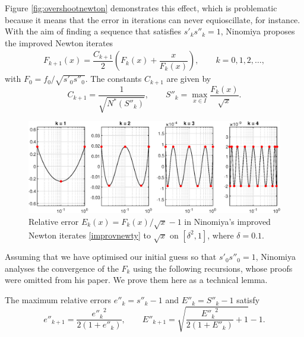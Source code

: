 Figure \ref{fig:overshootnewton} demonstrates this effect, which is problematic because it means that the error in iterations can never equioscillate, for instance. With the aim of finding a sequence that satisfies $s'_ks''_k=1$, Ninomiya proposes the improved Newton iterates
\begin{align}
   F_{k+1}(x) = \dfrac{C_{k+1}}{2}\left(F_k(x)+\dfrac{x}{F_k(x)}\right), \qquad k=0,1,2,\dots, \label{improvnewty}
\end{align}
with $F_0=f_0/\sqrt{s'_0s''_0}$. The constants $C_{k+1}$ are given by
\[C_{k+1} = \dfrac{1}{\sqrt{N^*(S''_{k})}}, \qquad S''_k = \max_{x\in I} \dfrac{F_k(x)}{\sqrt{x}}.\]

\begin{figure}[t!]
\centering
   \includegraphics[width=\textwidth,height=\textheight,keepaspectratio]{figures/chapter_2/improvednewton_rational.eps}
    \caption{Relative error $E_k(x)=F_k(x)/\sqrt{x}-1$ in Ninomiya's improved Newton iterates \eqref{improvnewty} to $\sqrt{x}$ on $[\delta^2,1]$, where $\delta=0.1$.}
   \label{fig:improvednewton_rational}
\end{figure}

Assuming that we have optimised our initial guess so that $s'_0s''_0=1$, Ninomiya analyses the convergence of the $F_k$ using the following recursions, whose proofs were omitted from his paper. We prove them here as a technical lemma.

\begin{lemma}\label{EEEk}
The maximum relative errors $e''_k=s''_k-1$ and $E''_k=S''_k-1$ satisfy
\[e''_{k+1}=\dfrac{{e''_k}^2}{2(1+e''_k)}, \qquad E''_{k+1}=\sqrt{\dfrac{{E''_k}^2}{2(1+E''_k)}+1}-1.\]
\end{lemma}

